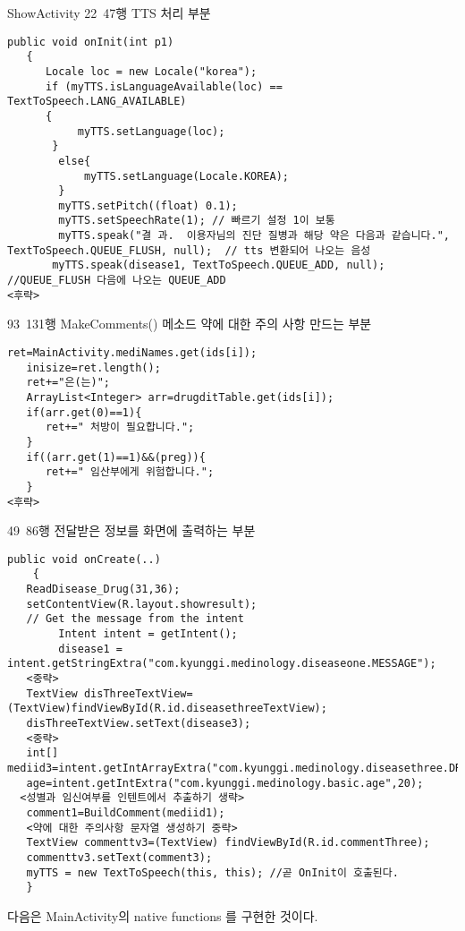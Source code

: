 \documentclass{report}
\begin{document}
ShowActivity 22~47행 TTS 처리 부분
\begin{verbatim}
public void onInit(int p1)
   {
      Locale loc = new Locale("korea");
      if (myTTS.isLanguageAvailable(loc) == TextToSpeech.LANG_AVAILABLE)
      {
           myTTS.setLanguage(loc);
       }
        else{
            myTTS.setLanguage(Locale.KOREA);
        }
        myTTS.setPitch((float) 0.1);
        myTTS.setSpeechRate(1); // 빠르기 설정 1이 보통 
        myTTS.speak("결 과.  이용자님의 진단 질병과 해당 약은 다음과 같습니다.", TextToSpeech.QUEUE_FLUSH, null);  // tts 변환되어 나오는 음성
       myTTS.speak(disease1, TextToSpeech.QUEUE_ADD, null);    //QUEUE_FLUSH 다음에 나오는 QUEUE_ADD
<후략>
\end{verbatim}
93~131행 MakeComments() 메소드 약에 대한 주의 사항 만드는 부분
\begin{verbatim}
ret=MainActivity.mediNames.get(ids[i]);
   inisize=ret.length();
   ret+="은(는)";
   ArrayList<Integer> arr=drugditTable.get(ids[i]);
   if(arr.get(0)==1){
      ret+=" 처방이 필요합니다.";
   }
   if((arr.get(1)==1)&&(preg)){
      ret+=" 임산부에게 위험합니다.";
   }
<후략>
\end{verbatim}
49~86행 전달받은 정보를 화면에 출력하는 부분
\begin{verbatim}
public void onCreate(..)
    {
   ReadDisease_Drug(31,36);
   setContentView(R.layout.showresult);
   // Get the message from the intent
        Intent intent = getIntent();
        disease1 = intent.getStringExtra("com.kyunggi.medinology.diseaseone.MESSAGE");
   <중략>
   TextView disThreeTextView=(TextView)findViewById(R.id.diseasethreeTextView);
   disThreeTextView.setText(disease3);
   <중략>
   int[] mediid3=intent.getIntArrayExtra("com.kyunggi.medinology.diseasethree.DRUGS");
   age=intent.getIntExtra("com.kyunggi.medinology.basic.age",20);
  <성별과 임신여부를 인텐트에서 추출하기 생략>
   comment1=BuildComment(mediid1);
   <약에 대한 주의사항 문자열 생성하기 중략>
   TextView commenttv3=(TextView) findViewById(R.id.commentThree);
   commenttv3.setText(comment3);
   myTTS = new TextToSpeech(this, this); //곧 OnInit이 호출된다.
   }
\end{verbatim}
다음은 MainActivity의 native functions 를 구현한 것이다.
\end{document}
